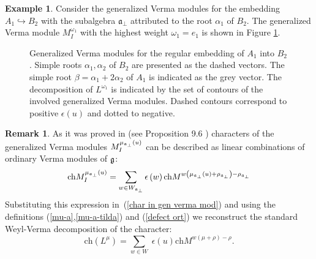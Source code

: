 \documentclass[12pt]{article}
\theoremstyle{definition}
\newtheorem{remark}{Remark}
\newtheorem{example}{Example}
\newcommand{\afb}{\mathfrak{a}_{\bot}}
\begin{document}
\begin{example}
  Consider the generalized Verma modules for the
  embedding  $A_{1}\hookrightarrow B_{2}$ with the subalgebra $\afb$ attributed to the
  root $\alpha_{1}$
  of $B_{2}$. The generalized Verma module $M^{\omega_{1}}_{I}$ with the highest weight
  $\omega_{1}=e_{1}$ is shown in Figure \ref{fig:B2_Verma_Decomp}.
  \begin{figure}[h!bt]
  \noindent{}
  \caption{Generalized Verma modules  for the regular embedding of $A_1$ into $B_2$.
  Simple roots $\alpha_1, \alpha_2$ of $B_2$ are presented as the dashed vectors.
    The simple root $\beta = \alpha_1+2\alpha_2$ of $A_1$ is indicated as the grey vector. The
    decomposition of $L^{\omega_{1}}$ is indicated by
    the set of contours of the involved generalized Verma
  modules. Dashed contours correspond to positive $\epsilon(u)$ and dotted to negative.}

 \label{fig:B2_Verma_Decomp}
\end{figure}

\end{example}

\begin{remark}
As it was proved in \cite{humphreys2008representations} (see Proposition 9.6
) characters of the generalized Verma modules $M_{I}^{\mu _{\frak{a}%
_{\perp }}\left( u\right) }$ can be described as linear combinations of
ordinary Verma modules of $\frak{g}$:
\begin{equation*}
\mathrm{ch}M_{I}^{\mu _{\frak{a}_{\perp }}\left( u\right) }=\sum_{w\in W_{%
\frak{a}_{\perp }}}\epsilon \left( w\right) \mathrm{ch}M^{w\left( \mu _{%
\frak{a}_{\perp }}\left( u\right) +\rho _{\frak{a}_{\perp }}\right) -\rho _{%
\frak{a}_{\perp }}}
\end{equation*}
Substituting this expression in\ (\ref{char in gen verma mod}) and using the
definitions (\ref{mu-a},\ref{mu-a-tilda}) and (\ref{defect ort}) we reconstruct
the standard Weyl-Verma decomposition of the character:
\begin{equation*}
\mathrm{ch}\left( L^{\mu }\right) =\sum_{w\in W}\;\epsilon (u)\mathrm{ch}%
M^{w\left( \mu +\rho \right) -\rho }.
\end{equation*}
\end{remark}
\end{document}
